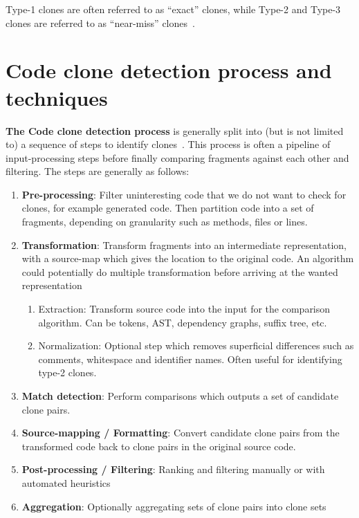 Type-1 clones are often referred to as ``exact'' clones, while Type-2 and Type-3 clones
are referred to as ``near-miss'' clones~\cite[1]{Zibran_real_time_search}.

\section{Code clone detection process and techniques}

\textbf{The Code clone detection process} is generally split into (but is not limited to)
a sequence of steps to identify clones~\cite{Inoue_introduction_to_cc}. This
process is often a pipeline of input-processing steps before finally comparing fragments
against each other and filtering. The steps are generally as follows:

\begin{enumerate}
	\item \textbf{Pre-processing}: Filter uninteresting code that we do not want to
	      check for clones, for example generated code. Then partition code into a set of
	      fragments, depending on granularity such as methods, files or lines.
	\item \textbf{Transformation}: Transform fragments into an intermediate
	      representation, with a source-map which gives the location to the original code.
          An algorithm could potentially do multiple transformation before arriving at the wanted
          representation
	      \begin{enumerate}
		      \item Extraction: Transform source code into the input for the comparison
		            algorithm. Can be tokens, AST, dependency graphs, suffix tree, etc.
		      \item Normalization: Optional step which removes superficial differences such as
		            comments, whitespace and identifier names. Often useful for identifying type-2
		            clones.
	      \end{enumerate}
	\item \textbf{Match detection}: Perform comparisons which outputs a set of
	      candidate clone pairs.
	\item \textbf{Source-mapping / Formatting}: Convert candidate clone pairs from the transformed
	      code back to clone pairs in the original source code.
	\item \textbf{Post-processing / Filtering}: Ranking and filtering manually or with
	      automated heuristics
	\item \textbf{Aggregation}: Optionally aggregating sets of clone pairs into clone sets
\end{enumerate}

